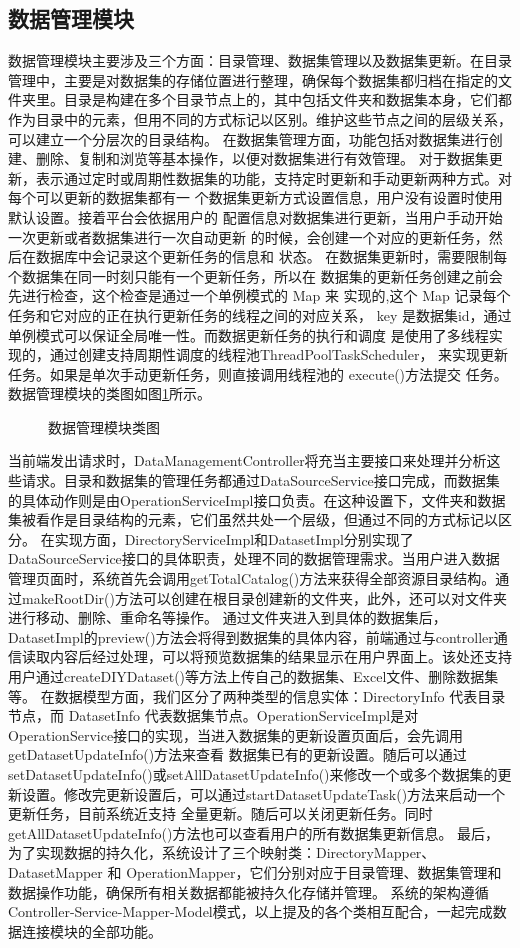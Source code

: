 \subsection{数据管理模块}
数据管理模块主要涉及三个方面：目录管理、数据集管理以及数据集更新。在目录管理中，主要是对数据集的存储位置进行整理，确保每个数据集都归档在指定的文件夹里。目录是构建在多个目录节点上的，其中包括文件夹和数据集本身，它们都作为目录中的元素，但用不同的方式标记以区别。维护这些节点之间的层级关系，可以建立一个分层次的目录结构。
在数据集管理方面，功能包括对数据集进行创建、删除、复制和浏览等基本操作，以便对数据集进行有效管理。
对于数据集更新，表示通过定时或周期性数据集的功能，支持定时更新和手动更新两种方式。对每个可以更新的数据集都有一
个数据集更新方式设置信息，用户没有设置时使用默认设置。接着平台会依据用户的
配置信息对数据集进行更新，当用户手动开始一次更新或者数据集进行一次自动更新
的时候，会创建一个对应的更新任务，然后在数据库中会记录这个更新任务的信息和
状态。
在数据集更新时，需要限制每个数据集在同一时刻只能有一个更新任务，所以在
数据集的更新任务创建之前会先进行检查，这个检查是通过一个单例模式的 Map 来
实现的,这个 Map 记录每个任务和它对应的正在执行更新任务的线程之间的对应关系，
key 是数据集id，通过单例模式可以保证全局唯一性。而数据更新任务的执行和调度
是使用了多线程实现的，通过创建支持周期性调度的线程池ThreadPoolTaskScheduler，
来实现更新任务。如果是单次手动更新任务，则直接调用线程池的 execute()方法提交
任务。
数据管理模块的类图如图\ref{fig:datamanageclass}所示。
\begin{figure}[H]
    \centering
    \caption{数据管理模块类图}
    \label{fig:datamanageclass}
\end{figure}
当前端发出请求时，DataManagementController将充当主要接口来处理并分析这些请求。目录和数据集的管理任务都通过DataSourceService接口完成，而数据集的具体动作则是由OperationServiceImpl接口负责。在这种设置下，文件夹和数据集被看作是目录结构的元素，它们虽然共处一个层级，但通过不同的方式标记以区分。
在实现方面，DirectoryServiceImpl和DatasetImpl分别实现了DataSourceService接口的具体职责，处理不同的数据管理需求。当用户进入数据管理页面时，系统首先会调用getTotalCatalog()方法来获得全部资源目录结构。通过makeRootDir()方法可以创建在根目录创建新的文件夹，此外，还可以对文件夹进行移动、删除、重命名等操作。
通过文件夹进入到具体的数据集后，DatasetImpl的preview()方法会将得到数据集的具体内容，前端通过与controller通信读取内容后经过处理，可以将预览数据集的结果显示在用户界面上。该处还支持用户通过createDIYDataset()等方法上传自己的数据集、Excel文件、删除数据集等。
在数据模型方面，我们区分了两种类型的信息实体：DirectoryInfo 代表目录节点，而 DatasetInfo 代表数据集节点。OperationServiceImpl是对OperationService接口的实现，当进入数据集的更新设置页面后，会先调用getDatasetUpdateInfo()方法来查看
数据集已有的更新设置。随后可以通过setDatasetUpdateInfo()或setAllDatasetUpdateInfo()来修改一个或多个数据集的更新设置。修改完更新设置后，可以通过startDatasetUpdateTask()方法来启动一个更新任务，目前系统近支持
全量更新。随后可以关闭更新任务。同时getAllDatasetUpdateInfo()方法也可以查看用户的所有数据集更新信息。
最后，为了实现数据的持久化，系统设计了三个映射类：DirectoryMapper、DatasetMapper 和 OperationMapper，它们分别对应于目录管理、数据集管理和数据操作功能，确保所有相关数据都能被持久化存储并管理。
系统的架构遵循Controller-Service-Mapper-Model模式，以上提及的各个类相互配合，一起完成数据连接模块的全部功能。
